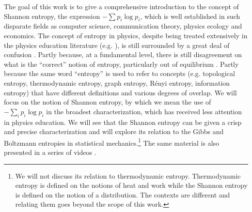 \documentclass[iopart]{revtex4-1}
\begin{document}
The goal of this work is to give a comprehensive introduction to the concept of Shannon entropy, the expression $-\sum p_i \log p_i$, which is well established in such disparate fields as computer science, communication theory, physics \cite{Jaynes1957-1, Grandy} ecology and economics. The concept of entropy in physics, despite being treated extensively in the physics education literature (e.g. \cite{LeffPartI, LeffPartII, LeffPartIII, LeffPartIV, LeffPartV, carson2002undergraduate, baierlein1994entropy, geller2014entropy}), is still surrounded by a great deal of confusion \cite{Swendsen, Styer}. Partly because, at a fundamental level, there is still disagreement on what is the ``correct'' notion of entropy, particularly out of equilibrium \cite{jarzynski2017stochastic, goldstein2019gibbs, maes2003time}. Partly because the same word ``entropy'' is used to refer to concepts (e.g. topological entropy, thermodynamic entropy, graph entropy, R\'{e}nyi entropy, information entropy) that have different definitions and various degrees of overlap.  We will focus on the notion of Shannon entropy, by which we mean the use of $- \sum_i p_i \log p_i$ in the broadest characterization, which has received less attention in physics education. We will see that the Shannon entropy can be given a crisp and precise characterization and will explore its relation to the Gibbs and Boltzmann entropies in statistical mechanics.\footnote{We will not discuss its relation to thermodynamic entropy. Thermodynamic entropy is defined on the notions of heat and work while the Shannon entropy is defined on the notion of a distribution. The contexts are different and relating them goes beyond the scope of this work. } The same material is also presented in a series of videos \cite{videos}.
\end{document}
